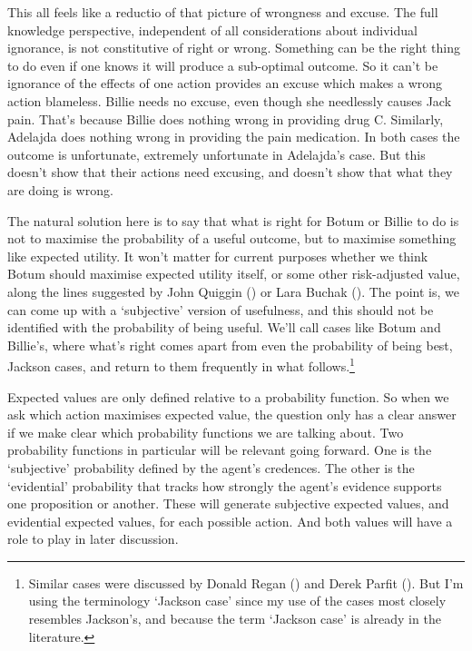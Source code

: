 \documentclass[
  10pt,
  letterpaper,
  twoside]{scrbook}
\begin{document}
This all feels like a reductio of that picture of wrongness and excuse.
The full knowledge perspective, independent of all considerations about
individual ignorance, is not constitutive of right or wrong. Something
can be the right thing to do even if one knows it will produce a
sub-optimal outcome. So it can't be ignorance of the effects of one
action provides an excuse which makes a wrong action blameless. {Billie}
needs no excuse, even though she needlessly causes {Jack} pain. That's
because {Billie} does nothing wrong in providing drug C. Similarly,
{Adelajda} does nothing wrong in providing the pain medication. In both
cases the outcome is unfortunate, extremely unfortunate in {Adelajda}'s
case. But this doesn't show that their actions need excusing, and
doesn't show that what they are doing is wrong.

The natural solution here is to say that what is right for {Botum} or
{Billie} to do is not to maximise the probability of a useful outcome,
but to maximise something like expected utility. It won't matter for
current purposes whether we think {Botum} should maximise expected
utility itself, or some other risk-adjusted value, along the lines
suggested by John Quiggin () or Lara
Buchak (). The point is, we can come up
with a `subjective' version of usefulness, and this should not be
identified with the probability of being useful. We'll call cases like
{Botum} and {Billie}'s, where what's right comes apart from even the
probability of being best, Jackson cases, and return to them frequently
in what follows.\footnote{Similar cases were discussed by Donald Regan
  () and Derek Parfit
  (). But I'm using the terminology
  `Jackson case' since my use of the cases most closely resembles
  Jackson's, and because the term `Jackson case' is already in the
  literature.}

Expected values are only defined relative to a probability function. So
when we ask which action maximises expected value, the question only has
a clear answer if we make clear which probability functions we are
talking about. Two probability functions in particular will be relevant
going forward. One is the `subjective' probability defined by the
agent's credences. The other is the `evidential' probability that tracks
how strongly the agent's evidence supports one proposition or another.
These will generate subjective expected values, and evidential expected
values, for each possible action. And both values will have a role to
play in later discussion.
\end{document}
